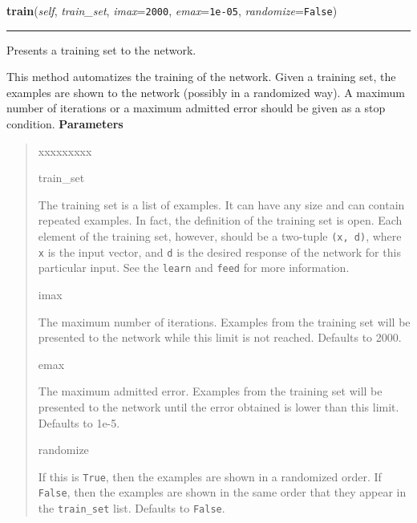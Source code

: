     \label{peach:nn:nnet:FeedForward:train}

    \vspace{0.5ex}

\hspace{.8\funcindent}\begin{boxedminipage}{\funcwidth}

    \raggedright \textbf{train}(\textit{self}, \textit{train\_set}, \textit{imax}={\tt 2000}, \textit{emax}={\tt 1e-05}, \textit{randomize}={\tt False})

    \vspace{-1.5ex}

    \rule{\textwidth}{0.5\fboxrule}
\setlength{\parskip}{2ex}

Presents a training set to the network.

This method automatizes the training of the network. Given a training
set, the examples are shown to the network (possibly in a randomized
way). A maximum number of iterations or a maximum admitted error should
be given as a stop condition.
\setlength{\parskip}{1ex}
      \textbf{Parameters}
      \vspace{-1ex}

      \begin{quote}
        \begin{Ventry}{xxxxxxxxx}

          \item[train\_set]


The training set is a list of examples. It can have any size and can
contain repeated examples. In fact, the definition of the training
set is open. Each element of the training set, however, should be a
two-tuple \texttt{(x, d)}, where \texttt{x} is the input vector, and \texttt{d} is
the desired response of the network for this particular input. See
the \texttt{learn} and \texttt{feed} for more information.
          \item[imax]


The maximum number of iterations. Examples from the training set
will be presented to the network while this limit is not reached.
Defaults to 2000.
          \item[emax]


The maximum admitted error. Examples from the training set will be
presented to the network until the error obtained is lower than this
limit. Defaults to 1e-5.
          \item[randomize]


If this is \texttt{True}, then the examples are shown in a randomized
order. If \texttt{False}, then the examples are shown in the same order
that they appear in the \texttt{train\_set} list. Defaults to \texttt{False}.
        \end{Ventry}

      \end{quote}

    \end{boxedminipage}


